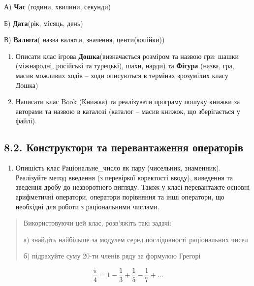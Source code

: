 \documentclass[]{article}
\begin{document}
А) \textbf{Час} (години, хвилини, секунди)

Б) \textbf{Дата}(рік, місяць, день)

В) \textbf{Валюта}( назва валюти, значення, центи(копійки))

\begin{enumerate}
\def\labelenumi{\arabic{enumi})}
\item
  Описати клас ігрова \textbf{Дошка}(визначається розміром та назвою
  гри: шашки (міжнародні, російські та турецькі), шахи, нарди) та
  \textbf{Фігура} (назва, гра, масив можливих ходів -- ходи описуються в
  термінах зрозумілих класу Дошка)
\item
  Написати клас Book (Книжка) та реалізувати програму пошуку книжки за
  авторами та назвою в каталозі (каталог -- масив книжок, що
  зберігається у файлі).
\end{enumerate}

\subsection{8.2. Конструктори та перевантаження
операторів}\label{ux43aux43eux43dux441ux442ux440ux443ux43aux442ux43eux440ux438-ux442ux430-ux43fux435ux440ux435ux432ux430ux43dux442ux430ux436ux435ux43dux43dux44f-ux43eux43fux435ux440ux430ux442ux43eux440ux456ux432}

\begin{enumerate}
\def\labelenumi{\arabic{enumi})}
\item
  Опишість клас Раціональне\_число як пару (чисельник, знаменник).
  Реалізуйте метод введення (з перевіркої коректості вводу), виведення
  та зведення дробу до незворотного вигляду. Також у класі перевантажте
  основні арифметичні оператори, оператори порівняння та інші оператори,
  що необхідні для роботи з раціональними числами.
\end{enumerate}

\begin{quote}
Використовуючи цей клас, розв'яжіть такі задачі:

а) знайдіть найбільше за модулем серед послідовності раціональних чисел

б) підрахуйте суму 20-ти членів ряду за формулою Грегорі
\end{quote}

\[\frac{\pi}{4} = 1 - \frac{1}{3} + \frac{1}{5} - \frac{1}{7} + \ldots\]
\end{document}
